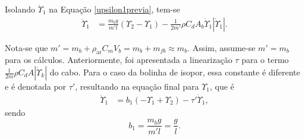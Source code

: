  Isolando $\ddot{\Upsilon}_1$ na Equação \ref{upsilon1previa}, tem-se \begin{align}
 	\ddot{\Upsilon}_1 &= \frac{m_b g}{m'l}\left(\Upsilon_2 - \Upsilon_1\right)  - \frac{1}{2m'}\rho C_d A_b \dot{\Upsilon}_1 \left|\dot{\Upsilon}_1\right|.
 \end{align} 
 
  Nota-se que $m' = m_b + \rho_{\textrm{ar}} C_m V_b = m_b + m_{fb} \approx m_b$. Assim, assume-se $m' = m_b$ para os cálculos. Anteriormente, foi apresentada a linearização $\tau$ para o termo $\frac{1}{2m}\rho C_d A\left|\dot{\Upsilon}_k\right|$ do cabo. Para o caso da bolinha de isopor, essa constante é diferente e é denotada por $\tau'$, resultando na equação final para $\Upsilon_1$, que é \begin{align}
 	\ddot{\Upsilon}_1 &= b_1\left(-\Upsilon_1 + \Upsilon_2\right) - \tau'\dot{\Upsilon}_1\label{upsilon1final},
 \end{align} sendo \begin{equation}
 	b_1 = \frac{m_b g}{m'l} = \frac{g}{l}.
 \end{equation}

